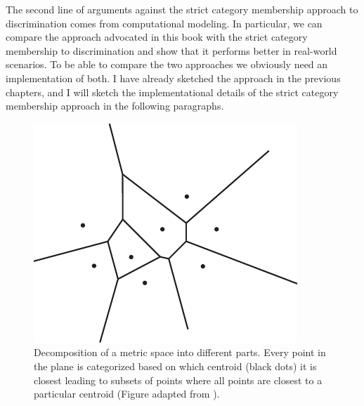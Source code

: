 The second line of arguments against the strict category membership 
approach to discrimination comes from computational modeling. In particular, we
can compare the approach advocated in this book with the strict category membership 
to discrimination and show that it performs better
in real-world scenarios. To be able to compare the two approaches
we obviously need an implementation of both. I have already sketched
the approach in the previous chapters, and I will sketch the implementational
details of the strict category membership approach in the following paragraphs.

\begin{figure}
\begin{center}
\includegraphics[width=0.3\columnwidth]{figs/voronoi}
\end{center}
\caption[Voronoi tesselation]{Decomposition of a metric space into different parts.
Every point in the plane is categorized based on which
centroid (black dots) it is closest leading to subsets of
points where all points are closest to a particular centroid (Figure adapted from 
\citealt{aurenhammer1991voronoi}).}
\label{f:voronoi}
\end{figure}

